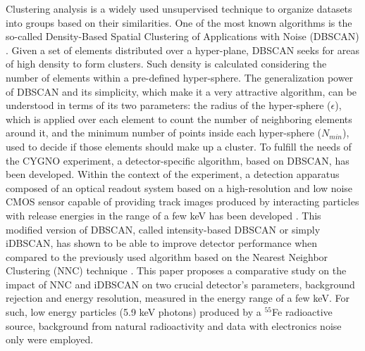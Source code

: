 \documentclass[a4paper,11pt]{article}
\begin{document}
Clustering analysis is a widely used unsupervised technique to organize datasets into groups based on their similarities.
One of the most known algorithms is the so-called Density-Based Spatial Clustering of Applications with Noise (DBSCAN) \cite{dbscan1996}.
Given a set of elements distributed over a hyper-plane, DBSCAN seeks for areas of high density to form clusters. Such density is calculated considering the number of elements within a pre-defined hyper-sphere.
The generalization power of DBSCAN and its simplicity, which make it a very attractive algorithm, can be understood in terms of its two parameters: the radius of the hyper-sphere ($\epsilon$), which is applied over each element to count the number of neighboring elements around it, and the minimum number of points inside each hyper-sphere ($N_{min}$), used to decide if those elements should make up a cluster.
To fulfill the needs of the CYGNO experiment, a detector-specific algorithm, based on DBSCAN, has been developed.
Within the context of the experiment,
a detection apparatus composed of an optical readout system based on a high-resolution and low noise CMOS sensor capable of providing track images produced by interacting particles with release energies in the range of a few keV has been developed \cite{bib:ref1,bib:ref2,bib:ref3,bib:ref4,bib:nim_orange1,bib:jinst_orange2}.
This modified version of DBSCAN, called intensity-based DBSCAN or simply iDBSCAN,
has shown to be able to improve detector performance when compared to the previously used algorithm based on the Nearest Neighbor Clustering (NNC) technique \cite{bib:fe55}.
This paper proposes a comparative study on the impact of NNC and iDBSCAN on two crucial detector's parameters, background rejection and energy resolution, measured in the energy range of a few keV.
For such, low energy particles (5.9 keV photons) produced by a $^{55}$Fe radioactive source, background from natural radioactivity and data with electronics noise only were employed. 
\end{document}
